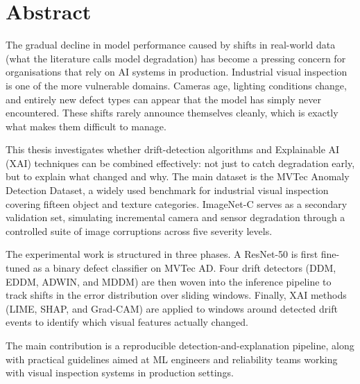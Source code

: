
\chapter*{Abstract}

The gradual decline in model performance caused by shifts in real-world data (what the literature calls model degradation) has become a pressing concern for organisations that rely on AI systems in production. Industrial visual inspection is one of the more vulnerable domains. Cameras age, lighting conditions change, and entirely new defect types can appear that the model has simply never encountered. These shifts rarely announce themselves cleanly, which is exactly what makes them difficult to manage.

This thesis investigates whether drift-detection algorithms and Explainable AI (XAI) techniques can be combined effectively: not just to catch degradation early, but to explain what changed and why. The main dataset is the MVTec Anomaly Detection Dataset, a widely used benchmark for industrial visual inspection covering fifteen object and texture categories. ImageNet-C serves as a secondary validation set, simulating incremental camera and sensor degradation through a controlled suite of image corruptions across five severity levels.

The experimental work is structured in three phases. A ResNet-50 is first fine-tuned as a binary defect classifier on MVTec AD. Four drift detectors (DDM, EDDM, ADWIN, and MDDM) are then woven into the inference pipeline to track shifts in the error distribution over sliding windows. Finally, XAI methods (LIME, SHAP, and Grad-CAM) are applied to windows around detected drift events to identify which visual features actually changed.

The main contribution is a reproducible detection-and-explanation pipeline, along with practical guidelines aimed at ML engineers and reliability teams working with visual inspection systems in production settings.

